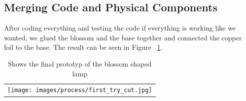 \documentclass[doc.tex]{subfiles}
\begin{document}
    \subsection{Merging Code and Physical Components}
        \begin{flushleft}
            After coding everything and testing the code if everything is working like we wanted, we glued
            the blossom and the base together and connected the copper foil to the base. The result can be 
            seen in Figure ~\ref{fig:finalPrototyp}.
        \end{flushleft}

        \begin{table}[h!]
            \centering
            \begin{tabular}{c}
              \centering
              \texttt{[image: images/process/first\_try\_cut.jpg]}
            \end{tabular}
            \caption{Shows the final prototyp of the blossom shaped lamp}
            \label{fig:finalPrototyp}
        \end{table}
\end{document}
